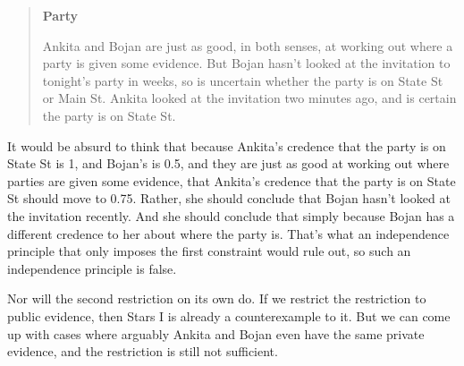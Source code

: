 \begin{quote}
\textbf{Party}

\gls{Ankita} and \gls{Bojan} are just as good, in both senses, at working out where a party is given some evidence. But \gls{Bojan} hasn't looked at the invitation to tonight's party in weeks, so is uncertain whether the party is on State St or Main St. \gls{Ankita} looked at the invitation two minutes ago, and is certain the party is on State St.
\end{quote}
It would be absurd to think that because \gls{Ankita}'s credence that the party is on State St is 1, and \gls{Bojan}'s is 0.5, and they are just as good at working out where parties are given some evidence, that \gls{Ankita}'s credence that the party is on State St should move to 0.75. Rather, she should conclude that \gls{Bojan} hasn't looked at the invitation recently. And she should conclude that simply because \gls{Bojan} has a different credence to her about where the party is. That's what an independence principle that only imposes the first constraint would rule out, so such an independence principle is false.

Nor will the second restriction on its own do. If we restrict the restriction to public evidence, then Stars I is already a counterexample to it. But we can come up with cases where arguably \gls{Ankita} and \gls{Bojan} even have the same private evidence, and the restriction is still not sufficient.

